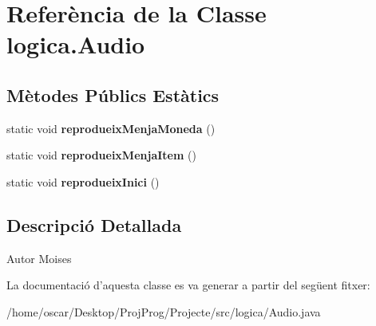\hypertarget{classlogica_1_1_audio}{\section{Referència de la Classe logica.\+Audio}
\label{classlogica_1_1_audio}
}
\subsection*{Mètodes Públics Estàtics}
\begin{DoxyCompactItemize}
\item 
\hypertarget{classlogica_1_1_audio_a36e406167c180e2bdb7c646c7a4c645d}{static void {\bfseries reprodueix\+Menja\+Moneda} ()}\label{classlogica_1_1_audio_a36e406167c180e2bdb7c646c7a4c645d}

\item 
\hypertarget{classlogica_1_1_audio_a6a897d93efd13a0c96d4518bf7e041c0}{static void {\bfseries reprodueix\+Menja\+Item} ()}\label{classlogica_1_1_audio_a6a897d93efd13a0c96d4518bf7e041c0}

\item 
\hypertarget{classlogica_1_1_audio_a5079c1c587da3b4bf704b5e20314b0c5}{static void {\bfseries reprodueix\+Inici} ()}\label{classlogica_1_1_audio_a5079c1c587da3b4bf704b5e20314b0c5}

\end{DoxyCompactItemize}


\subsection{Descripció Detallada}
\begin{DoxyAuthor}{Autor}
Moises 
\end{DoxyAuthor}


La documentació d'aquesta classe es va generar a partir del següent fitxer\+:\begin{DoxyCompactItemize}
\item 
/home/oscar/\+Desktop/\+Proj\+Prog/\+Projecte/src/logica/Audio.\+java\end{DoxyCompactItemize}
